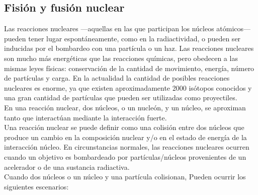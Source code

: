 \subsection{Fisión y fusión nuclear}
    
Las reacciones nucleares —aquellas en las que participan los núcleos atómicos— pueden tener lugar espontáneamente, como en la radiactividad, o pueden ser inducidas por el bombardeo con una partícula o un haz. Las reacciones nucleares son mucho más
energéticas que las reacciones químicas, pero obedecen a las mismas leyes físicas: conservación de la cantidad de movimiento,
energía, número de partículas y carga. En la actualidad la cantidad de posibles reacciones nucleares es enorme, ya que existen aproximadamente 2000 isótopos conocidos y una gran cantidad de partículas que pueden ser utilizadas como proyectiles.  \cite{Murray.2020}\\
En una reacción nuclear, dos núcleos, o un nucleón, y un núcleo, se aproximan tanto que interactúan mediante la interacción fuerte. \cite{Cottingham.2001}\\ 
Una reacción nuclear se puede definir como una colisión entre dos núcleos que produce un
cambio en la composición nuclear y/o en el estado de energía de la interacción
núcleo. En circunstancias normales, las reacciones nucleares ocurren cuando un objetivo es bombardeado por partículas/núcleos provenientes de un acelerador o de una sustancia radiactiva.\\
Cuando dos núcleos o un núcleo y una partícula colisionan, Pueden ocurrir los siguientes escenarios: 
